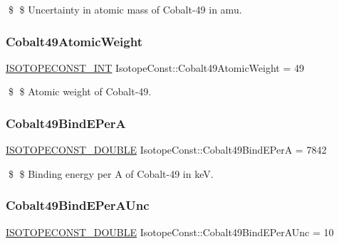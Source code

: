 \$ \$ Uncertainty in atomic mass of Cobalt-\/49 in amu. \mbox{\label{group___isotope_const-_cobalt-_co49_gaeefbf2ae11376bb822a3e8fe986651d2}} 
\subsubsection{\texorpdfstring{Cobalt49\+Atomic\+Weight}{Cobalt49AtomicWeight}}
{\footnotesize\ttfamily \mbox{\hyperlink{group___isotope_const-_macros_ga5f18360b3e99483a35c32d789e62621c}{I\+S\+O\+T\+O\+P\+E\+C\+O\+N\+S\+T\+\_\+\+I\+NT}} Isotope\+Const\+::\+Cobalt49\+Atomic\+Weight = 49}

\$ \$ Atomic weight of Cobalt-\/49. \mbox{\label{group___isotope_const-_cobalt-_co49_ga46986fb6b2032122e59d1df94921d90f}} 
\subsubsection{\texorpdfstring{Cobalt49\+Bind\+E\+PerA}{Cobalt49BindEPerA}}
{\footnotesize\ttfamily \mbox{\hyperlink{group___isotope_const-_macros_ga8f45a7272ce02c0b4c65c44636ed719a}{I\+S\+O\+T\+O\+P\+E\+C\+O\+N\+S\+T\+\_\+\+D\+O\+U\+B\+LE}} Isotope\+Const\+::\+Cobalt49\+Bind\+E\+PerA = 7842}

\$ \$ Binding energy per A of Cobalt-\/49 in keV. \mbox{\label{group___isotope_const-_cobalt-_co49_ga2db872d07cbf90f92f8de1b1b21465f7}} 
\subsubsection{\texorpdfstring{Cobalt49\+Bind\+E\+Per\+A\+Unc}{Cobalt49BindEPerAUnc}}
{\footnotesize\ttfamily \mbox{\hyperlink{group___isotope_const-_macros_ga8f45a7272ce02c0b4c65c44636ed719a}{I\+S\+O\+T\+O\+P\+E\+C\+O\+N\+S\+T\+\_\+\+D\+O\+U\+B\+LE}} Isotope\+Const\+::\+Cobalt49\+Bind\+E\+Per\+A\+Unc = 10}

